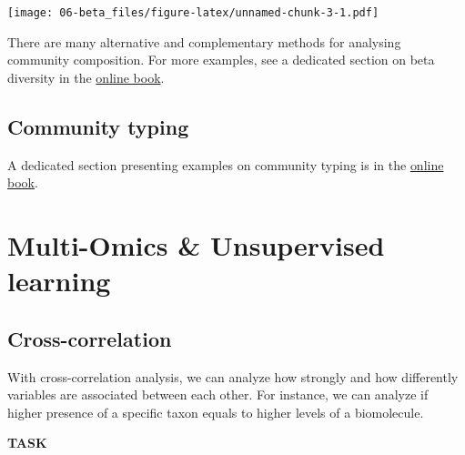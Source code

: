 \documentclass[
  oneside]{book}
\begin{document}
\texttt{[image: 06-beta\_files/figure-latex/unnamed-chunk-3-1.pdf]}

There are many alternative and complementary methods for analysing
community composition. For more examples, see a dedicated section on
beta diversity in the \href{https://microbiome.github.io/OMA/microbiome-diversity.html\#beta-diversity}{online
book}.

\hypertarget{community-typing}{%
\section{Community typing}\label{community-typing}}

A dedicated section presenting examples on community typing is in the
\href{https://microbiome.github.io/OMA/microbiome-community.html\#community-typing}{online book}.

\hypertarget{multi-omics-unsupervised-learning}{%
\chapter{Multi-Omics \& Unsupervised learning}\label{multi-omics-unsupervised-learning}}

\hypertarget{cross-correlation}{%
\section{Cross-correlation}\label{cross-correlation}}

With cross-correlation analysis, we can analyze how strongly and how differently variables
are associated between each other. For instance, we can analyze if higher presence of a
specific taxon equals to higher levels of a biomolecule.

\textbf{TASK}
\end{document}
